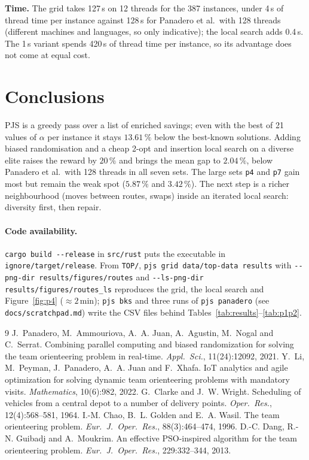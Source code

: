 \documentclass[10pt,a4paper]{article}
\begin{document}
\textbf{Time.} The grid takes 127\,s on 12 threads for the 387 instances, under 4\,s of thread time per
instance against 128\,s for Panadero et al.\ with 128 threads (different machines and languages, so
only indicative); the local search adds 0.4\,s. The 1\,s variant spends 420\,s of thread time per
instance, so its advantage does not come at equal cost.

\section{Conclusions}

PJS is a greedy pass over a list of enriched savings; even with the best of 21 values of $\alpha$ per
instance it stays $13.61\,\%$ below the best-known solutions. Adding biased
randomisation and a cheap 2-opt and insertion local search on a diverse elite raises the reward by
$20\,\%$ and brings the mean gap to $2.04\,\%$, below Panadero et al.\ with 128 threads in all
seven sets. The large sets \texttt{p4} and \texttt{p7} gain most but remain the weak spot ($5.87\,\%$
and $3.42\,\%$). The next step is a richer neighbourhood (moves between routes, swaps)
inside an iterated local search: diversity first, then repair.

\begin{sloppypar}
\paragraph{Code availability.} \texttt{cargo build -{}-release} in \texttt{src/rust} puts the executable in
\texttt{ignore/target/release}. From \texttt{TOP/}, \texttt{pjs grid data/top-data results} with
\texttt{-{}-png-dir results/figures/routes} and \texttt{-{}-ls-png-dir results/figures/routes\_ls}
reproduces the grid, the local search and Figure~\ref{fig:p4} ($\approx2$\,min); \texttt{pjs bks} and three runs of
\texttt{pjs panadero} (see \texttt{docs/scratchpad.md}) write the CSV files behind Tables~\ref{tab:results}--\ref{tab:p1p2}.
\end{sloppypar}

\begin{thebibliography}{9}
\footnotesize\setlength{\itemsep}{0pt}\setlength{\parskip}{0pt}
 J.~Panadero, M.~Ammouriova, A.~A. Juan, A.~Agustin, M.~Nogal and C.~Serrat.
Combining parallel computing and biased randomization for solving the team orienteering problem in
real-time. \emph{Appl.\ Sci.}, 11(24):12092, 2021.
 Y.~Li, M.~Peyman, J.~Panadero, A.~A. Juan and F.~Xhafa. IoT analytics and agile
optimization for solving dynamic team orienteering problems with mandatory visits.
\emph{Mathematics}, 10(6):982, 2022.
 G.~Clarke and J.~W. Wright. Scheduling of vehicles from a central depot to a number of
delivery points. \emph{Oper.\ Res.}, 12(4):568--581, 1964.
 I.-M. Chao, B.~L. Golden and E.~A. Wasil. The team orienteering problem.
\emph{Eur.\ J.\ Oper.\ Res.}, 88(3):464--474, 1996.
 D.-C. Dang, R.-N. Guibadj and A.~Moukrim. An effective PSO-inspired algorithm for the
team orienteering problem. \emph{Eur.\ J.\ Oper.\ Res.}, 229:332--344, 2013.
\end{thebibliography}
\end{document}
